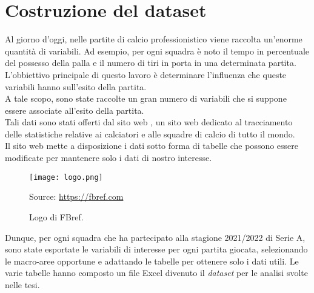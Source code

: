 \section{Costruzione del dataset}

Al giorno d'oggi, nelle partite di calcio professionistico viene raccolta un'enorme quantità di variabili. Ad esempio, per ogni squadra è noto il tempo in percentuale del possesso della palla e il numero di tiri in porta in una determinata partita. L'obbiettivo principale di questo lavoro è determinare l'influenza che queste variabili hanno sull'esito della partita. \\
A tale scopo, sono state raccolte un gran numero di variabili che si suppone essere associate all'esito della partita.\\
Tali dati sono stati offerti dal sito web \textit{\cite{fbref}}, un sito web dedicato al tracciamento delle statistiche relative ai calciatori e alle squadre di calcio di tutto il mondo. \\
Il sito web \textit{\cite{fbref}} mette a disposizione i dati sotto forma di tabelle che possono essere modificate per mantenere solo i dati di nostro interesse.\\
\begin{figure}[!htb]
	\begin{center}
		\texttt{[image: logo.png]}
		\caption{Logo di FBref.} 
		Source: \url{https://fbref.com}
		\label{fig:logo}
	\end{center}
\end{figure}
Dunque, per ogni squadra che ha partecipato alla stagione 2021/2022 di Serie A, sono state esportate le variabili di interesse per ogni partita giocata, selezionando le macro-aree opportune e adattando le tabelle per ottenere solo i dati utili. Le varie tabelle hanno composto un file Excel divenuto il \emph{dataset} per le analisi svolte nelle tesi.

